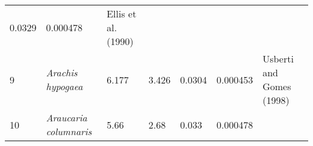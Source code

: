\documentclass[]{article}
\begin{document}
\begin{longtable}[]{@{}lllllll@{}}
\begin{minipage}[t]{0.08\columnwidth}
0.0329\strut
\end{minipage} & \begin{minipage}[t]{0.08\columnwidth}\raggedright
0.000478\strut
\end{minipage} & \begin{minipage}[t]{0.23\columnwidth}\raggedright
Ellis et al. (1990)\strut
\end{minipage}\tabularnewline
\begin{minipage}[t]{0.05\columnwidth}\raggedright
9\strut
\end{minipage} & \begin{minipage}[t]{0.23\columnwidth}\raggedright
\emph{Arachis hypogaea}\strut
\end{minipage} & \begin{minipage}[t]{0.05\columnwidth}\raggedright
6.177\strut
\end{minipage} & \begin{minipage}[t]{0.08\columnwidth}\raggedright
3.426\strut
\end{minipage} & \begin{minipage}[t]{0.08\columnwidth}\raggedright
0.0304\strut
\end{minipage} & \begin{minipage}[t]{0.08\columnwidth}\raggedright
0.000453\strut
\end{minipage} & \begin{minipage}[t]{0.23\columnwidth}\raggedright
Usberti and Gomes (1998)\strut
\end{minipage}\tabularnewline
\begin{minipage}[t]{0.05\columnwidth}\raggedright
10\strut
\end{minipage} & \begin{minipage}[t]{0.23\columnwidth}\raggedright
\emph{Araucaria columnaris}\strut
\end{minipage} & \begin{minipage}[t]{0.05\columnwidth}\raggedright
5.66\strut
\end{minipage} & \begin{minipage}[t]{0.08\columnwidth}\raggedright
2.68\strut
\end{minipage} & \begin{minipage}[t]{0.08\columnwidth}\raggedright
0.033\strut
\end{minipage} & \begin{minipage}[t]{0.08\columnwidth}\raggedright
0.000478\strut
\end{minipage} & \begin{minipage}[t]{0.23\columnwidth}\raggedright

\end{minipage}
\end{longtable}
\end{document}
